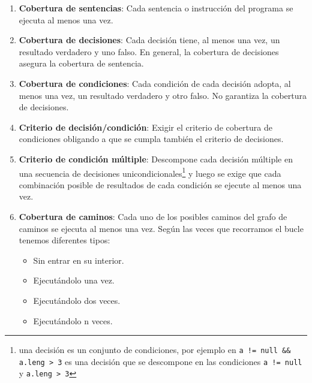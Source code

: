\begin{enumerate}
    \item \textbf{Cobertura de sentencias}: Cada sentencia o instrucción del programa se ejecuta al menos una vez.
    
    \item \textbf{Cobertura de decisiones}: Cada decisión tiene, al menos una vez, un resultado verdadero y uno falso. En general, la cobertura de decisiones asegura la cobertura de sentencia.
    
    \item \textbf{Cobertura de condiciones}: Cada condición de cada decisión adopta, al menos una vez, un resultado verdadero y otro falso. No garantiza la cobertura de decisiones.
    
    \item \textbf{Criterio de decisión/condición}: Exigir el criterio de cobertura de condiciones obligando a que se cumpla también el criterio de decisiones.
    
    \item \textbf{Criterio de condición múltiple}: Descompone cada decisión múltiple en una secuencia de decisiones unicondicionales\footnote{una decisión es un conjunto de condiciones, por ejemplo en 
    \texttt{a != null \&\& a.leng > 3} es una decisión que se descompone en las condiciones \texttt{a != null} y \texttt{a.leng > 3}} y luego se exige que cada combinación posible de resultados de cada condición se ejecute al menos una vez. %
    
    \item \textbf{Cobertura de caminos}: Cada uno de los posibles caminos del grafo de caminos  se ejecuta al menos una vez. Según las veces que recorramos el bucle tenemos diferentes tipos:
    \begin{itemize}
        \item Sin entrar en su interior.
        \item Ejecutándolo una vez.
        \item Ejecutándolo dos veces.
        \item Ejecutándolo n veces.
    \end{itemize}
\end{enumerate}



